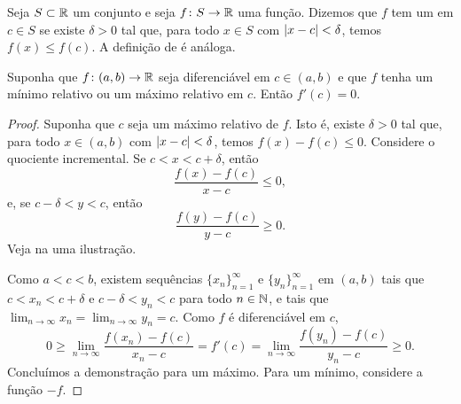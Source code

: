 \begin{defn}
Seja $S \subset {\mathbb{R}}$ um conjunto e
seja $f \colon S \to {\mathbb{R}}$ uma função. Dizemos que $f$ tem
um \emph{}
em $c \in S$ se existe $\delta>0$
tal que, para todo $x \in S$ com $\lvert {x-c} \rvert < \delta$,
temos $f(x) \leq f(c)$.
A definição de
\emph{}
é análoga.
\end{defn}

\begin{lemma}\label{relminmax:lemma}
Suponha que $f \colon (a,b) \to {\mathbb{R}}$ seja diferenciável em $c \in (a,b)$
e que $f$ tenha
um mínimo relativo ou um máximo relativo em $c$. Então
$f'(c) = 0$.
\end{lemma}

\begin{proof}
Suponha que $c$ seja um
máximo relativo de $f$. Isto é, existe $\delta > 0$ tal
que, para todo $x \in (a,b)$ com
$\lvert {x-c} \rvert < \delta$, temos $f(x)-f(c) \leq 0$.
Considere o quociente incremental. Se $c < x < c+\delta$, então
\begin{equation*}
\frac{f(x)-f(c)}{x-c} \leq 0 ,
\end{equation*}
e, se $c-\delta < y < c$, então
\begin{equation*}
\frac{f(y)-f(c)}{y-c} \geq 0 .
\end{equation*}
Veja na  uma ilustração.
\begin{myfigureht}
\caption{Inclinações de retas secantes em um máximo relativo.\label{fig:critpt}}
\end{myfigureht}

Como $a < c < b$, existem
sequências $\{ x_n \}_{n=1}^\infty$ e
$\{ y_n \}_{n=1}^\infty$ em $(a,b)$
tais que $c < x_n < c+\delta$ e
$c-\delta < y_n < c$ para todo $n \in {\mathbb{N}}$, e tais que
$\lim_{n\to\infty} x_n = \lim_{n\to\infty} y_n = c$.
Como $f$
é diferenciável em $c$,
\begin{equation*}
0 \geq \lim_{n\to\infty} \frac{f(x_n)-f(c)}{x_n-c} 
=
f'(c)
=
\lim_{n\to\infty} \frac{f(y_n)-f(c)}{y_n-c} \geq 0.
\end{equation*}
Concluímos a demonstração para um máximo.
Para um mínimo, considere
a função $-f$.
\end{proof}

